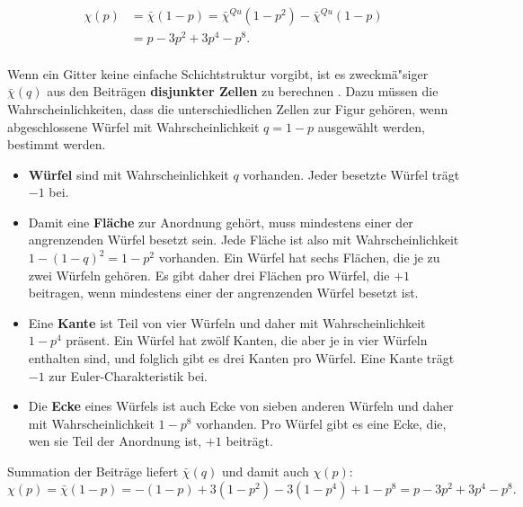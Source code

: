 \begin{equation}
\begin{split}
  \chi(p) & =\bar{\chi}(1-p)=\bar{\chi}^{Qu}(1-p^2)-\bar{\chi}^{Qu}(1-p)\\
&=p-3p^2+3p^4-p^8.
\end{split}
\end{equation}
\\Wenn ein Gitter keine einfache Schichtstruktur vorgibt, ist es zweckm\"a"siger $\bar{\chi}(q)$ aus den Beitr\"agen \textbf{disjunkter Zellen} zu berechnen \cite{Likos:95}. Dazu m\"ussen die Wahrscheinlichkeiten, dass die unterschiedlichen Zellen zur Figur geh\"oren, wenn abgeschlossene W\"urfel mit Wahrscheinlichkeit $q=1-p$ ausgew\"ahlt werden, bestimmt werden. 
\begin{itemize}
\item \textbf{W\"urfel} sind mit Wahrscheinlichkeit $q$ vorhanden. Jeder besetzte W\"urfel tr\"agt $-1$ bei.
\item Damit eine \textbf{Fl\"ache} zur Anordnung geh\"ort, muss mindestens einer der angrenzenden W\"urfel besetzt sein. Jede Fl\"ache ist also mit Wahrscheinlichkeit $1-(1-q)^2=1-p^2$ vorhanden. Ein W\"urfel hat sechs Fl\"achen, die je zu zwei W\"urfeln geh\"oren. Es gibt daher drei Fl\"achen pro W\"urfel, die $+1$ beitragen, wenn mindestens einer der angrenzenden W\"urfel besetzt ist.
\item Eine \textbf{Kante} ist Teil von vier W\"urfeln und daher mit Wahrscheinlichkeit $1-p^4$ pr\"asent. Ein W\"urfel hat zw\"olf Kanten, die aber je in vier W\"urfeln enthalten sind, und folglich gibt es drei Kanten pro W\"urfel. Eine Kante tr\"agt $-1$ zur Euler-Charakteristik bei.
\item Die \textbf{Ecke} eines W\"urfels ist auch Ecke von sieben anderen W\"urfeln und daher mit Wahrscheinlichkeit $1-p^8$ vorhanden. Pro W\"urfel gibt es eine Ecke, die, wen sie Teil der Anordnung ist, $+1$ beitr\"agt.
\end{itemize}
Summation der Beitr\"age liefert $\bar{\chi}(q)$ und damit auch $\chi(p)$:
\begin{equation}
  \chi(p)  =\bar{\chi}(1-p)=-(1-p)+3(1-p^2)-3(1-p^4)+1-p^8=p-3p^2+3p^4-p^8.
\end{equation}\\

